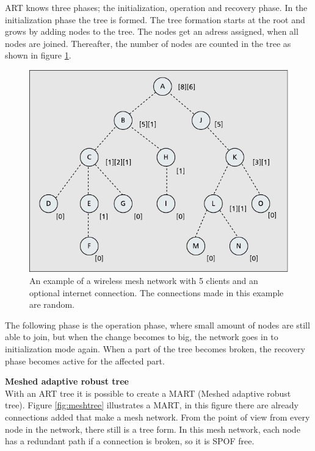 \documentclass[10pt,a4paper]{article}
\begin{document}
ART knows three phases; the initialization, operation and recovery phase. In the initialization phase the tree is formed. The tree formation starts at the root and grows by adding nodes to the tree. The nodes get an adress assigned, when all nodes are joined. Thereafter, the number of nodes are counted in the tree as shown in figure \ref{fig:treenumbers}.

\begin{figure}[H]
   \centering
   \includegraphics[width=1\textwidth]{treenumbers}
   \caption{An example of a wireless mesh network with 5 clients and an optional internet connection. The connections made in this example are random.}
   \label{fig:treenumbers}
\end{figure}

The following phase is the operation phase, where small amount of nodes are still able to join, but when the change becomes to big, the network goes in to initialization mode again. When a part of the tree becomes broken, the recovery phase becomes active for the affected part.

\textbf{\large Meshed adaptive robust tree}\\
With an ART tree it is possible to create a MART (Meshed adaptive robust tree). Figure \ref{fig:meshtree} illustrates a MART, in this figure there are already connections added that make a mesh network. From the point of view from every node in the network, there still is a tree form. In this mesh network, each node has a redundant path if a connection is broken, so it is SPOF free.
\end{document}
